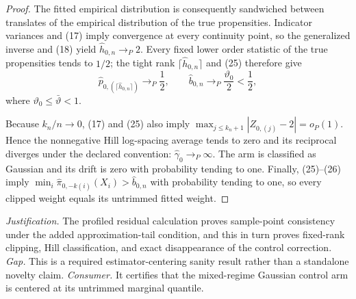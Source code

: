 \documentclass{article}
\begin{document}
\begin{proof}
The fitted empirical distribution is consequently sandwiched between translates of the empirical distribution of the true propensities.  Indicator variances and (17) imply convergence at every continuity point, so the generalized inverse and (18) yield
\(\widehat h_{0,n}\to_P2\).  Every fixed lower order statistic of the true propensities tends to \(1/2\); the tight rank
\(\lceil\widehat h_{0,n}\rceil\) and (25) therefore give
\[
\widehat p_{0,(\lceil\widehat h_{0,n}\rceil)}\to_P\frac12,\qquad
\widehat b_{0,n}\to_P\frac{\vartheta_0}{2}<\frac12,
\tag{26}
\]
where \(\vartheta_0\le\bar\vartheta<1\).

Because \(k_n/n\to0\), (17) and (25) also imply
\(\max_{j\le k_n+1}|Z_{0,(j)}-2|=o_P(1)\).  Hence the nonnegative Hill log-spacing average tends to zero and its reciprocal diverges under the declared convention:
\(\widehat\gamma_0\to_P\infty\).  The arm is classified as Gaussian and its drift is zero with probability tending to one.  Finally, (25)--(26) imply
\(\min_i\widehat\pi_{0,-k(i)}(X_i)>\widehat b_{0,n}\) with probability tending to one, so every clipped weight equals its untrimmed fitted weight.
\end{proof}
\par\smallskip\noindent \textit{Justification.} The profiled residual calculation proves sample-point consistency under the added approximation-tail condition, and this in turn proves fixed-rank clipping, Hill classification, and exact disappearance of the control correction. \textit{Gap.} This is a required estimator-centering sanity result rather than a standalone novelty claim. \textit{Consumer.} It certifies that the mixed-regime Gaussian control arm is centered at its untrimmed marginal quantile.
\end{document}
